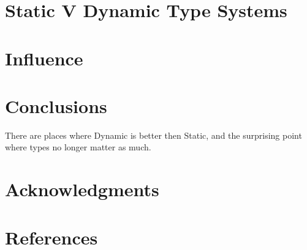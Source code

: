 \documentclass{sig-alternate}
\begin{document}
\section{Static V Dynamic Type Systems}

\section{Influence}

\section{Conclusions}
There are places where Dynamic is better then Static, and the surprising point where types no longer matter as much.

\section{Acknowledgments}

\section{References}
  

\end{document}
